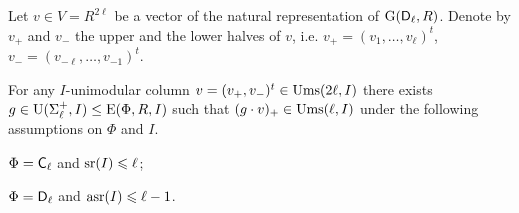 Let $v\in V=R^{2\ell}$ be a vector of the natural representation of $\operatorname{G}(\mathsf{D}_\ell, R)$.
Denote by $v_+$ and $v_-$ the upper and the lower halves of $v$, i.e. $v_+=(v_1,\ldots, v_\ell)^t$, $v_-=(v_{-\ell},\ldots, v_{-1})^t$.
\begin{lemma}\label{lemma:asrUnip}
For any $I$-unimodular column $v=(v_+, v_-)^t\in\operatorname{Ums}(2\ell, I)$ there exists $g\in\operatorname{U}(\Sigma^+_\ell, I) \leq \operatorname{E}(\Phi, R, I)$ 
such that $(g \cdot v)_+ \in \operatorname{Ums}(\ell, I)$ under the following assumptions on $\Phi$ and $I$.
\begin{lemlist}
\item \label{item:asrUnipC} $\Phi=\mathsf{C}_\ell$ and $\operatorname{sr}(I) \leqslant \ell$;
\item \label{item:asrUnipD} $\Phi=\mathsf{D}_\ell$ and $\operatorname{asr}(I)\leqslant \ell -1$.
\end{lemlist}
\end{lemma}
